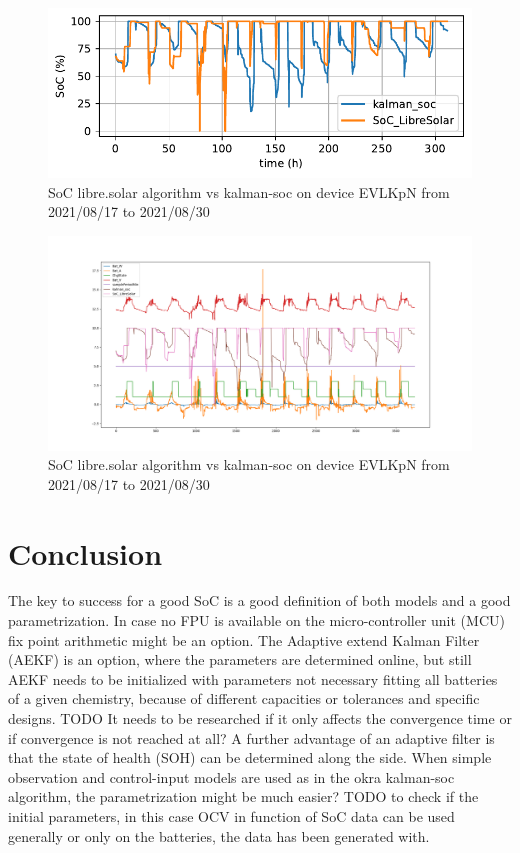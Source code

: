 \begin{figure}
\centering	
\includegraphics{librevskalman}
\caption{\label{fig:librevskalman} SoC libre.solar algorithm vs kalman-soc on device EVLKpN from 2021/08/17 to 2021/08/30 }
\end{figure}

\begin{figure}
\centering	
\includegraphics[width=16cm]{figure_1.png}
\caption{\label{fig:librevskalmanall} SoC libre.solar algorithm vs kalman-soc on device EVLKpN from 2021/08/17 to 2021/08/30 }
\end{figure}


\chapter{Conclusion}

The key to success for a good SoC is a good definition of both models and a good parametrization. %
In case no FPU is available on the micro-controller unit (MCU) fix point arithmetic might be an option. 
The Adaptive extend Kalman Filter (AEKF) is an option, where the parameters are determined online, but still AEKF needs to be initialized with parameters not necessary fitting all batteries of a given chemistry, because of different capacities or tolerances and specific designs. 
TODO It needs to be researched if it only affects the convergence time or if convergence is not reached at all? A further advantage of an adaptive filter is that the state of health (SOH) can be determined along the side. 
When simple observation and control-input models are used as in the okra kalman-soc algorithm, the parametrization might be much easier?
TODO to check if the initial parameters, in this case OCV in function of SoC data can be used generally or only on the batteries, the data has been generated with. \\

